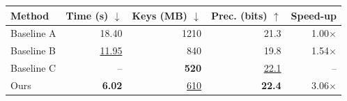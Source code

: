 \begin{tabular}{lrrrr}
\toprule
Method & Time (s) $\downarrow$ & Keys (MB) $\downarrow$ & Prec. (bits) $\uparrow$ & Speed-up \\
\midrule
Baseline A & 18.40 & 1210 & 21.3 & 1.00$\times$ \\
Baseline B & \underline{11.95} & 840 & 19.8 & 1.54$\times$ \\
Baseline C & -- & \textbf{520} & \underline{22.1} & -- \\
\midrule
Ours & \textbf{6.02} & \underline{610} & \textbf{22.4} & 3.06$\times$ \\
\bottomrule
\end{tabular}
